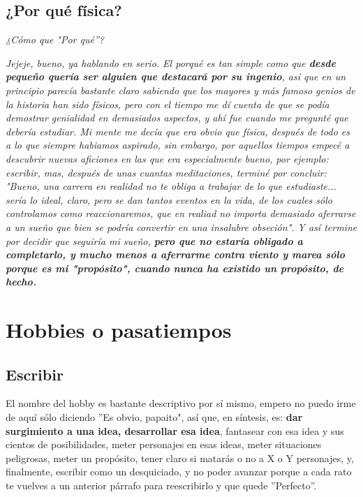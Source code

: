 \documentclass[12pt,letterpaper]{article}
\begin{document}
    \subsection{\huge{¿Por qué física?}}

{\Large{\textsl{¿Cómo que "Por qué''?\\}}}

{\textsl{Jejeje, bueno, ya hablando en serio. El porqué es tan simple como que {\large{\textbf{desde pequeño quería ser alguien que destacará por su ingenio}}}, así que en un principio parecía bastante claro sabiendo que los mayores y más famoso genios de la historia han sido físicos, pero con el tiempo me dí cuenta de que se podía demostrar genialidad en demasiados aspectos, y ahí fue cuando me pregunté que debería estudiar. Mi mente me decía que era obvio que física, después de todo es a lo que siempre habiamos aspirado, sin embargo, por aquellos tiempos empecé a descubrir nuevas aficiones en las que era especialmente bueno, por ejemplo: escribir, mas, después de unas cuantas meditaciones, terminé por concluir: "Bueno, una carrera en realidad no te obliga a trabajar de lo que estudiaste... sería lo ideal, claro, pero se dan tantos eventos en la vida, de los cuales sólo controlamos como reaccionaremos, que en realiad no importa demasiado aferrarse a un sueño que bien se podría convertir en una insalubre obseción". Y así termine por decidir que seguiría mi sueño, {\large{\textbf{pero que no estaría obligado a completarlo, y mucho menos a aferrarme contra viento y marea sólo porque es mi "propósito", cuando nunca ha existido un propósito, de hecho.}}}}}

\section{\Huge{\textbf{Hobbies o pasatiempos}}}

    \subsection{\huge{Escribir}}

{\textsf{El nombre del hobby es bastante descriptivo por sí mismo, empero no puedo irme de aquí sólo diciendo ''Es obvio, papaito", así que, en síntesis, es: {\large{\textbf{dar surgimiento a una idea, desarrollar esa idea}}}, fantasear con esa idea y sus cientos de posibilidades, meter personajes en esas ideas, meter situaciones peligrosas, meter un propósito, tener claro si matarás o no a X o Y personajes, y, finalmente, escribir como un desquiciado, y no poder avanzar porque a cada rato te vuelves a un anterior párrafo para reescribirlo y que quede ''Perfecto''.\\}}
\end{document}
